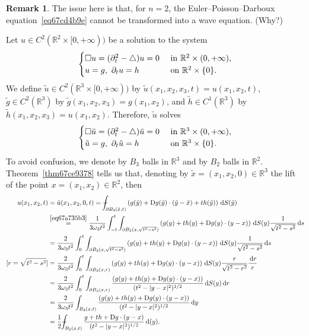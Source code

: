 \documentclass[a4paper,9pt]{amsart}
\newcommand{\R}{\mathbb{R}}	%
\newcommand{\did}{\,\mathrm{d}}	%
\newcommand{\de}{\partial}		%
\newcommand{\Diff}{\mathrm{D}}
\newcommand{\laplacian}{\triangle}
\def\Xint#1{\mathchoice
      {\XXint\displaystyle\textstyle{#1}}%
      {\XXint\textstyle\scriptstyle{#1}}%
      {\XXint\scriptstyle\scriptscriptstyle{#1}}%
      {\XXint\scriptscriptstyle\scriptscriptstyle{#1}}%
      \!\int}
\def\XXint#1#2#3{{\setbox0=\hbox{$#1{#2#3}{\int}$}
        \vcenter{\hbox{$#2#3$}}\kern-.5\wd0}}
\def\fint{\Xint-}
\theoremstyle{plain}
\theoremstyle{definition}
\newtheorem{remark}[proposition]{Remark}
\theoremstyle{remark}
\begin{document}
\begin{remark}
	The issue here is that, for $n=2$, the Euler--Poisson--Darboux equation~\eqref{eq67cd4b9e} cannot be transformed into a wave equation.
	(Why?)
\end{remark}

Let $u\in C^2(\R^2\times[0,+\infty))$ be a solution to the system
\begin{equation}
\begin{cases}
	\waveop u = ( \de_t^2-\laplacian )u = 0 & \text{ in }\R^2\times(0,+\infty) , \\
	u = g,\ \de_t u = h & \text{ on }\R^2\times\{0\} .
\end{cases}
\end{equation}
We define $\tilde u\in C^2(\R^3\times[0,+\infty))$ by $\tilde u(x_1,x_2,x_3,t) = u(x_1,x_2,t)$,
$\tilde g\in C^2(\R^3)$ by $\tilde g(x_1,x_2,x_3) = g(x_1,x_2)$,
and $\tilde h\in C^1(\R^3)$ by $\tilde h(x_1,x_2,x_3) = u(x_1,x_2)$.
Therefore, $\tilde u$ solves
\begin{equation}
\begin{cases}
	\waveop \tilde u = ( \de_t^2-\laplacian )\tilde u = 0 & \text{ in }\R^3\times(0,+\infty) , \\
	\tilde u = g,\ \de_t \tilde u = h & \text{ on }\R^3\times\{0\} .
\end{cases}
\end{equation}
To avoid confusion, we denote by $B_3$ balls in $\R^3$ and by $B_2$ balls in $\R^2$.
Theorem~\ref{thm67ce9378} tells us that, 
denoting by $\tilde x= (x_1,x_2,0)\in \R^3$ the lift of the point $x=(x_1,x_2)\in\R^2$, then
\begin{align*}
	u(x_1,x_2,t)
 	&= \tilde u(x_1,x_2,0,t) 
	= \fint_{\de B_3(\tilde x,t)} \left( g(\tilde y) + \Diff g(\tilde y)\cdot (\tilde y-\tilde x) + th(\tilde y) \right) \did S(\tilde y)  \\
	&\overset{\eqref{eq67a735b3}}= \frac{1}{3\omega_3 t^2} \int_{-t}^t \int_{\de B_2(x,\sqrt{t^2-s^2})}
		\left( g(y) + t h(y) + \Diff g(y)\cdot (y-x) \right) \did S(y) \frac{1}{\sqrt{t^2-s^2}} \did s \\
	&= \frac{2}{3\omega_3 t^2} \int_0^t \int_{\de B_2(x,\sqrt{t^2-s^2})}
		\left( g(y) + t h(y) + \Diff g(y)\cdot (y-x) \right) \did S(y) \frac{1}{\sqrt{t^2-s^2}} \did s \\
	\text{[$r=\sqrt{t^2-s^2}$]}
	&= \frac{2}{3\omega_3 t^2} \int_0^t \int_{\de B_2(x,r)} \left(g(y) + th(y) + \Diff g(y)\cdot (y-x) \right) \did S(y) \frac{r}{\sqrt{t^2-r^2}} \frac{\did r}{r} \\
	&= \frac{2}{3\omega_3 t^2} \int_0^t \int_{\de B_2(x,r)} \frac{ \left(g(y) + th(y) + \Diff g(y)\cdot (y-x) \right) }{ (t^2 - |y-x|^2)^{1/2} } \did S(y) \did r \\
	&= \frac{2}{3\omega_3 t^2} \int_{B_2(x,t)} \frac{ \left(g(y) + th(y) + \Diff g(y)\cdot (y-x) \right) }{ (t^2 - |y-x|^2)^{1/2} } \did y \\
	&= \frac12 \fint_{B_2(x,t)} \frac{g + th + \Diff g\cdot (y-x) }{ ( t^2 - |y-x|^2 )^{1/2} } \did (y) .
\end{align*}
\end{document}
